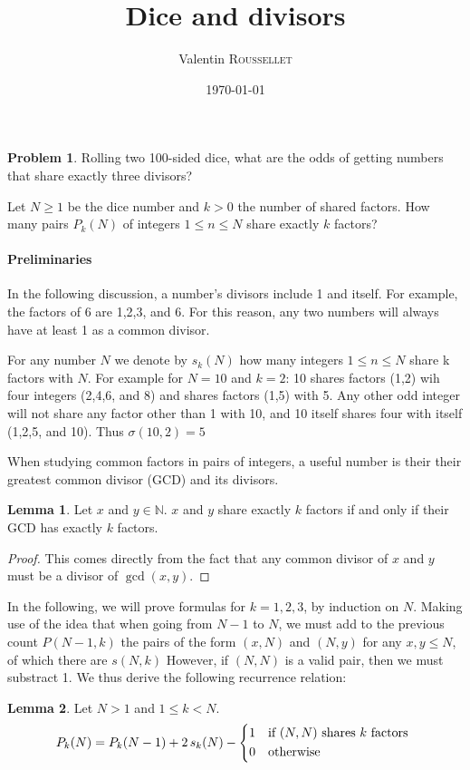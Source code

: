 \documentclass[a4paper, 10pt]{article}
\title{Dice and divisors}
\author{Valentin \textsc{Roussellet}}
\date{\today}
\numberwithin{equation}{section} %
\begin{document}
\maketitle

\theoremstyle{definition}
\newtheorem*{problem}{Problem}
\begin{problem}
Rolling two 100-sided dice, what are the odds of getting numbers that share exactly three divisors?
\end{problem}

Let $N \geq 1$ be the dice number and $k > 0$ the number of shared factors.
How many pairs $P_k(N)$ of integers $ 1 \leq n \leq N$ share exactly $k$ factors?

\paragraph{Preliminaries}
In the following discussion, a number's divisors include 1 and itself.
For example, the factors of 6 are 1,2,3, and 6.
For this reason, any two numbers will always have at least 1 as a common divisor.

For any number $N$ we denote by $s_k(N)$ how many integers $1 \leq n \leq N$
share k factors with $N$. For example for $N = 10$ and $k=2$: 10 shares factors (1,2) wih
four integers (2,4,6, and 8) and shares factors (1,5) with 5.
Any other odd integer will not share any factor other than 1 with 10,
and 10 itself shares four with itself (1,2,5, and 10). Thus $\sigma(10,2) = 5$

When studying common factors in pairs of integers, a useful
number is their their greatest common divisor (GCD) and its divisors.
\newtheorem{lemma}{Lemma}
\begin{lemma}
    Let $x$ and $y \in \mathbb{N}$.
    $x$ and $y$ share exactly $k$ factors if and only if their GCD
    has exactly $k$ factors.
    \label{thm:div}
\end{lemma}
\begin{proof}
    This comes directly from the fact that any common divisor of $x$ and $y$
    must be a divisor of $\gcd(x, y)$.
\end{proof}

In the following, we will prove formulas for $k=1,2,3$, by induction on $N$.
Making use of the idea that when going from $N-1$ to $N$, we must add to the previous count $P(N-1,k)$
the pairs of the form $(x,N)$ and $(N,y)$ for any $x,y \leq N$, of which there are $s(N,k)$
However, if $(N,N)$ is a valid pair, then we must substract 1.
We thus derive the following recurrence relation:
\begin{lemma}
    Let $N > 1$ and $ 1 \leq k < N$.
    \[ P_k(N) = P_k(N-1) + 2\, s_k(N) -
    \begin{dcases*}
        1 & if $(N,N)$ shares $k$ factors \\
        0 & otherwise
    \end{dcases*}
\]
    \label{thm:rec}
\end{lemma}
\end{document}
